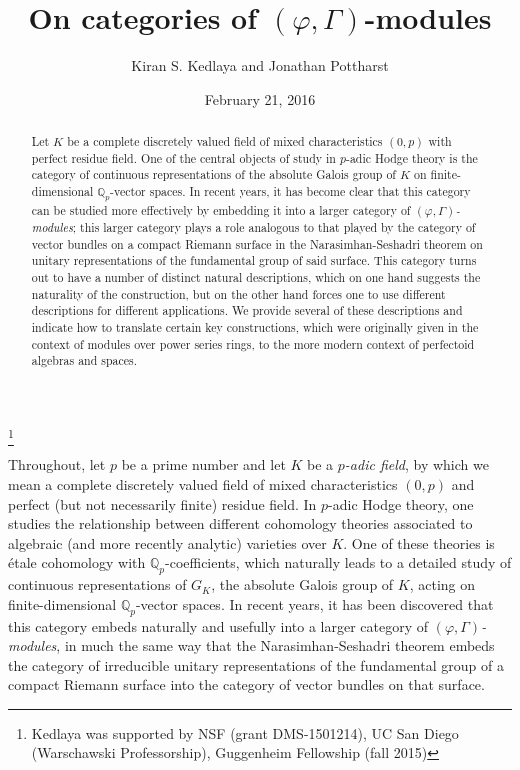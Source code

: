 \documentclass[12pt]{amsart}
\theoremstyle{definition}
\numberwithin{equation}{theorem}
\newcommand{\QQ}{\mathbb{Q}}
\begin{document}
\title{On categories of $(\varphi, \Gamma)$-modules}
\author{Kiran S. Kedlaya and Jonathan Pottharst}
\thanks{Kedlaya was supported by NSF (grant DMS-1501214), UC San Diego (Warschawski Professorship), Guggenheim Fellowship (fall 2015)}
\date{February 21, 2016}

\begin{abstract}
Let $K$ be a complete discretely valued field of mixed characteristics $(0,p)$ with perfect residue field. One of the central objects of study in $p$-adic Hodge theory is the cate\-gory of continuous representations of the absolute Galois group of $K$ on finite-dimensional $\QQ_p$-vector spaces. In recent years, it has become clear that this category can be studied more effectively by embedding it into a larger category of \emph{$(\varphi, \Gamma)$-modules}; this larger category plays a role analogous to that played by the category of vector bundles on a compact Riemann surface in the Narasimhan-Seshadri theorem on unitary representations of the fundamental group of said surface. This category turns out to have a number of distinct natural descriptions, which on one hand suggests the naturality of the construction, but on the other hand forces one to use different descriptions for different applications. We provide several of these descriptions and indicate how to translate certain key constructions, which were originally given in the context of modules over power series rings, to the more modern context of perfectoid algebras and spaces.
\end{abstract}

\maketitle

Throughout, let $p$ be a prime number and let $K$ be a \emph{$p$-adic field}, by which we mean a complete discretely valued field of mixed characteristics $(0,p)$ and perfect (but not necessarily finite) residue field. In $p$-adic Hodge theory, one studies the relationship between different cohomology theories associated to algebraic (and more recently analytic) varieties over $K$. One of these theories is \'etale cohomology with $\QQ_p$-coefficients, which naturally leads to a detailed study of continuous representations of $G_K$, the absolute Galois group of $K$, acting on finite-dimensional $\QQ_p$-vector spaces. In recent years, it has been discovered that this category embeds naturally and usefully into a larger category of \emph{$(\varphi, \Gamma)$-modules}, in much the same way that the Narasimhan-Seshadri theorem embeds the category of irreducible unitary representations of the fundamental group of a compact Riemann surface into the category of vector bundles on that surface.
\end{document}
